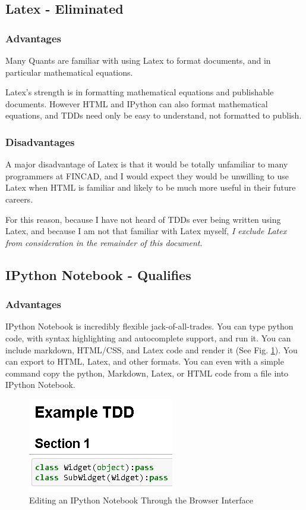 \documentclass[]{article}
\begin{document}
\subsection{Latex - Eliminated}
	\subsubsection{Advantages}
	
	Many Quants are familiar with using Latex to format documents, and in particular mathematical equations.
	
	Latex's strength is in formatting mathematical equations and publishable documents.  However HTML and IPython can also format mathematical equations, and TDDs need only be easy to understand, not formatted to publish.
	
	\subsubsection{Disadvantages}
	A major disadvantage of Latex is that it would be totally unfamiliar to many programmers at FINCAD, and I would expect they would be unwilling to use Latex when HTML is familiar and likely to be much more useful in their future careers.
	
	For this reason, because I have not heard of TDDs ever being written using Latex, and because I am not that familiar with Latex myself, \emph{I exclude Latex from consideration in the remainder of this document}.


\subsection{IPython Notebook - Qualifies}
	\subsubsection{Advantages}
		IPython Notebook is incredibly flexible jack-of-all-trades.  You can type python code, with syntax highlighting and autocomplete support, and run it.  You can include markdown, HTML/CSS, and Latex code and render it (See Fig. \ref{IPython}).  You can export to HTML, Latex, and other formats.  You can even with a simple command copy the python, Markdown, Latex, or HTML code from a file into IPython Notebook.
		
		\begin{figure}[h]
			\centering
			\includegraphics[scale=1]{IPython_Notebook.PNG}
			\caption{Editing an IPython Notebook Through the Browser Interface}
			\label{IPython}
		\end{figure}
		
\end{document}
